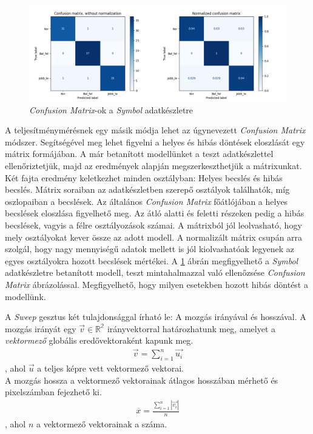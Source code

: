 
\begin{figure}[h]
\centering
\includegraphics[width=\textwidth]{images/confusion_m.png}
\caption{\textit{Confusion Matrix}-ok a \textit{Symbol} adatkészletre}
\label{fig:confusionm}
\end{figure}

A teljesítménymérésnek egy másik módja lehet az úgynevezett \textit{Confusion Matrix} módszer. Segítségével meg lehet figyelni a helyes és hibás döntések eloszlását egy mátrix formájában.\cite{koesmarno2019class}
A már betanított modellünket a teszt adatkészlettel ellenőriztetjük, majd az eredmények alapján megszerkeszthetjük a mátrixunkat. Két fajta eredmény keletkezhet minden osztályban: Helyes becslés és hibás becslés. Mátrix soraiban az adatkészletben szerepő osztályok találhatók, míg oszlopaiban a becslések. Az általános \textit{Confusion Matrix} főátlójában a helyes becslések eloszlása figyelhető meg. Az átló alatti és feletti részeken pedig a hibás becslések, vagyis a félre osztályozások számai. A mátrixból jól leolvasható, hogy mely osztályokat kever össze az adott modell. A normalizált mátrix csupán arra szolgál, hogy nagy mennyiségű adatok mellett is jól kiolvashatóak legyenek az egyes osztályokra hozott becslések mértékei.
A \ref{fig:confusionm} ábrán megfigyelhető a \textit{Symbol} adatkészletre betanított modell, teszt mintahalmazzal való ellenőzsése \textit{Confusion Matrix} ábrázolással. Megfigyelhető, hogy milyen esetekben hozott hibás döntést a modellünk.



A \textit{Sweep} gesztus két tulajdonsággal írható le: A mozgás irányával és hosszával. A mozgás irányát egy $\vec{v}\in\mathbb{R^2}$ irányvektorral határozhatunk meg, amelyet a \textit{vektormező} globális eredővektoraként kapunk meg.
\begin{align*}
  \vec{v} = \sum_{i=1}^n\vec{u_i}
\end{align*}
, ahol $\vec{u}$ a teljes képre vett vektormező vektorai.\\
A mozgás hossza a vektormező vektorainak átlagos hosszában mérhető és pixelszámban fejezhető ki.
\begin{align*}
  \overline{x}=\frac{\sum_{i=1}^n \left|\vec{v_i}\right|}{n}
\end{align*}
, ahol $n$ a vektormező vektorainak a száma.

